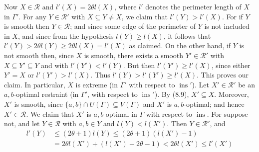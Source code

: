 Now $X \in \mathscr{R}$ and $l'(X) = 2\theta l(X)$, where $l'$ denotes the perimeter length of $X$ in $\Gamma'$. For any $Y \in \mathscr{R}'$ with $X \subseteq Y \ne X$, we claim that $l'(Y) > l'(X)$. For if $Y$ is smooth then $Y \in \mathscr{R}$; and since some edge of the perimeter of $Y$ is not included in $X$, and since from the hypothesis $l(Y) \ge l(X)$, it follows that $l'(Y) > 2\theta l(Y) \ge 2\theta l(X) = l'(X)$ as claimed. On the other hand, if $Y$ is not smooth then, since $X$ is smooth, there exists a smooth $Y' \in \mathscr{R}'$ with $X \subseteq Y' \subseteq Y$ and with $l'(Y') < l'(Y)$. But then $l'(Y') \ge l'(X)$, since either $Y' = X$ or $l'(Y') > l'(X)$. Thus $l'(Y) > l'(Y') \ge l'(X)$. This proves our claim. In particular, $X$ is extreme (in $\Gamma'$ with respect to $\operatorname{ins}'$). Let $X' \in \mathscr{R}'$ be an $a, b$-optimal restraint (in $\Gamma'$, with respect to $\operatorname{ins}'$). By (8.9), $X' \subseteq X$. Moreover, $X'$ is smooth, since $\{a, b\} \cap U(\Gamma) \subseteq V(\Gamma)$ and $X'$ is $a, b$-optimal; and hence $X' \in \mathscr{R}$. We claim that $X'$ is $a, b$-optimal in $\Gamma$ with respect to $\operatorname{ins}$. For suppose not, and let $Y \in \mathscr{R}$ with $a, b \in Y$ and $l(Y) < l(X')$. Then $Y \in \mathscr{R}'$, and
\begin{align*}
l'(Y) &\le (2\theta + 1) l(Y) \le (2\theta + 1)(l(X') - 1) \\
&= 2\theta l(X') + (l(X') - 2\theta - 1) < 2\theta l(X') \le l'(X')
\end{align*}
